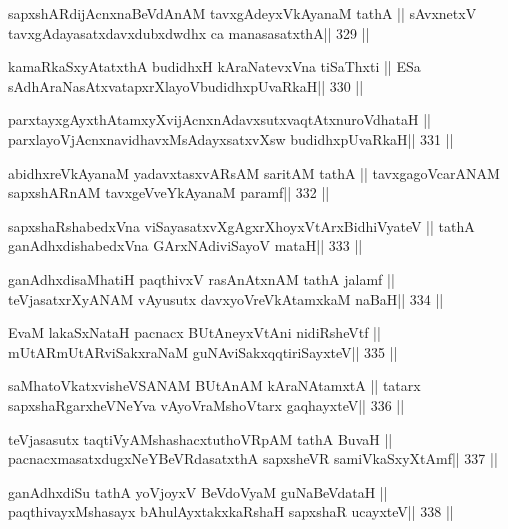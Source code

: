 \begin{shl}
sapxshARdijAcnxnaBeVdAnAM tavxgAdeyxVkAyanaM tathA ||
sAvxnetxV tavxgAdayasatxdavxdubxdwdhx ca manasasatxthA\hfill || 329 ||
\end{shl}

\begin{shl}
kamaRkaSxyAtatxthA budidhxH kAraNatevxVna tiSaThxti ||
ESa sAdhAraNasAtxvatapxrXlayoV\s budidhxpUvaRkaH\hfill || 330 ||
\end{shl}

\begin{shl}
parxtayxgAyxthAtamxyXvijAcnxnAdavxsutxvaqtAtxnuroVdhataH ||
parxlayoV\s jAcnxnavidhavxMsAdayxsatxvXsw budidhxpUvaRkaH\hfill || 331 ||
\end{shl}

\begin{shl}
abidhxreVkAyanaM yadavxtasxvARsAM saritAM tathA ||
tavxgagoVcarANAM sapxshARnAM tavxgeVveYkAyanaM paramf\hfill || 332 ||
\end{shl}

\begin{shl}
sapxshaRshabedxVna viSayasatxvXgAgxrXhoyxV\s tArxBidhiVyateV ||
tathA ganAdhxdishabedxVna GArxNAdiviSayoV mataH\hfill || 333 ||
\end{shl}

\begin{shl}
ganAdhxdisaMhatiH paqthivxV rasAnAtxnAM tathA jalamf ||
teVjasatxrXyANAM vAyusutx davxyoVreVkAtamxkaM naBaH\hfill || 334 ||
\end{shl}

\begin{shl}
EvaM lakaSxNataH pacnacx BUtAneyxVtAni nidiRsheVtf ||
mUtARmUtARviSakxraNaM guNAviSakxqqtiriSayxteV\hfill || 335 ||
\end{shl}

\begin{shl}
saMhatoVkatxvisheVSANAM BUtAnAM kAraNAtamxtA ||
tatarx sapxshaRgarxheVNeYva vAyoVraMshoV\s tarx gaqhayxteV\hfill || 336 ||
\end{shl}

\begin{shl}
teVjasasutx taqtiVyAMshashacxtuthoVR\s pAM tathA BuvaH ||
pacnacxmasatxdugxNeYBeVRdasatxthA sapxsheVR samiVkaSxyXtAmf\hfill || 337 ||
\end{shl}

\begin{shl}
ganAdhxdiSu tathA yoVjoyxV BeVdoV\s yaM guNaBeVdataH ||
paqthivayxMshasayx bAhulAyxtakxkaRshaH sapxshaR ucayxteV\hfill || 338 ||
\end{shl}

